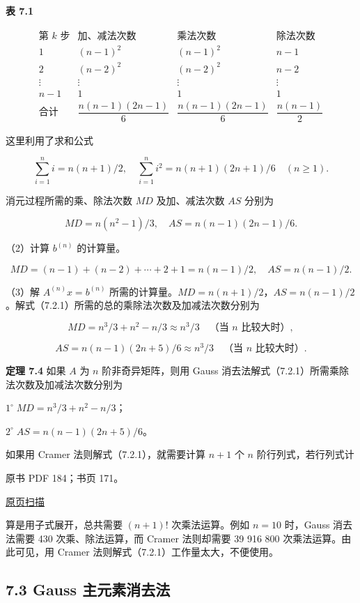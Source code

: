 \documentclass[
  10pt,
  fontset=fandol]{ctexart}
\begin{document}
\textbf{表 7.1}

\[
\begin{array}{c|c|c|c}
\text{第 }k\text{ 步}&\text{加、减法次数}&\text{乘法次数}&\text{除法次数}\\\hline
1&(n-1)^2&(n-1)^2&n-1\\
2&(n-2)^2&(n-2)^2&n-2\\
\vdots&\vdots&\vdots&\vdots\\
n-1&1&1&1\\\hline
\text{合计}&\dfrac{n(n-1)(2n-1)}{6}&\dfrac{n(n-1)(2n-1)}{6}&\dfrac{n(n-1)}{2}
\end{array}
\]

这里利用了求和公式

\[\sum_{i=1}^{n}i=n(n+1)/2,\quad \sum_{i=1}^{n}i^2=n(n+1)(2n+1)/6\quad(n\ge1).\]

消元过程所需的乘、除法次数 \(MD\) 及加、减法次数 \(AS\) 分别为

\[MD=n(n^2-1)/3,\quad AS=n(n-1)(2n-1)/6.\]

（2）计算 \(b^{(n)}\) 的计算量。

\[MD=(n-1)+(n-2)+\cdots+2+1=n(n-1)/2,\quad AS=n(n-1)/2.\]

（3）解 \(A^{(n)}x=b^{(n)}\) 所需的计算量。\(MD=n(n+1)/2\)，\(AS=n(n-1)/2\)。解式（7.2.1）所需的总的乘除法次数及加减法次数分别为

\[MD=n^3/3+n^2-n/3\approx n^3/3\quad\text{（当 $n$ 比较大时）},\]

\[AS=n(n-1)(2n+5)/6\approx n^3/3\quad\text{（当 $n$ 比较大时）}.\]

\textbf{定理 7.4} 如果 \(A\) 为 \(n\) 阶非奇异矩阵，则用 Gauss 消去法解式（7.2.1）所需乘除法次数及加减法次数分别为

\(1^\circ\;MD=n^3/3+n^2-n/3\)；

\(2^\circ\;AS=n(n-1)(2n+5)/6\)。

如果用 Cramer 法则解式（7.2.1），就需要计算 \(n+1\) 个 \(n\) 阶行列式，若行列式计

\clearpage

原书 PDF 184；书页 171。

\href{../../../source-images/pdf-184.jpeg}{原页扫描}

算是用子式展开，总共需要 \((n+1)!\) 次乘法运算。例如 \(n=10\) 时，Gauss 消去法需要 430 次乘、除法运算，而 Cramer 法则却需要 39 916 800 次乘法运算。由此可见，用 Cramer 法则解式（7.2.1）工作量太大，不便使用。

\subsection{7.3 Gauss 主元素消去法}\label{gauss-ux4e3bux5143ux7d20ux6d88ux53bbux6cd5}
\end{document}
